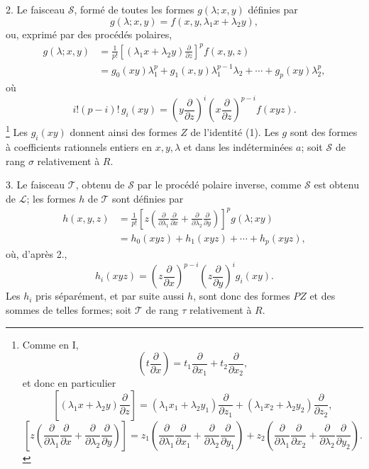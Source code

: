 2. Le faisceau $\mathcal S$, formé de toutes les formes $g(\lambda;x,y)$ définies par
\[
  g(\lambda;x,y)=f(x,y,\lambda_1x+\lambda_2y),
\]
ou, exprimé par des procédés polaires,
\[
\begin{aligned}
  g(\lambda;x,y)
  &=\frac1{p!}\left[(\lambda_1x+\lambda_2y)\frac{\partial}{\partial z}\right]^p f(x,y,z) \\
  &=g_0(xy)\lambda_1^p+g_1(x,y)\lambda_1^{p-1}\lambda_2+\cdots+g_p(xy)\lambda_2^p,
\end{aligned}
\]
où
\[
  i!(p-i)!\,g_i(xy)=
  \left(y\frac{\partial}{\partial z}\right)^i
  \left(x\frac{\partial}{\partial z}\right)^{p-i}f(xyz).
\]
\footnote{Comme en I,
\[
 \left(t\frac{\partial}{\partial x}\right)=t_1\frac{\partial}{\partial x_1}+t_2\frac{\partial}{\partial x_2},
\]
et donc en particulier
\[
 \left[(\lambda_1x+\lambda_2y)\frac{\partial}{\partial z}\right]
 = (\lambda_1x_1+\lambda_2y_1)\frac{\partial}{\partial z_1}
 + (\lambda_1x_2+\lambda_2y_2)\frac{\partial}{\partial z_2},
\]
\[
 \left[z\left(\frac{\partial}{\partial\lambda_1}\frac{\partial}{\partial x}
 +\frac{\partial}{\partial\lambda_2}\frac{\partial}{\partial y}\right)\right]
 =z_1\left(\frac{\partial}{\partial\lambda_1}\frac{\partial}{\partial x_1}
 +\frac{\partial}{\partial\lambda_2}\frac{\partial}{\partial y_1}\right)
 +z_2\left(\frac{\partial}{\partial\lambda_1}\frac{\partial}{\partial x_2}
 +\frac{\partial}{\partial\lambda_2}\frac{\partial}{\partial y_2}\right).
\]}
Les $g_i(xy)$ donnent ainsi des formes $Z$ de l'identité (1). Les $g$ sont des formes à coefficients rationnels entiers en $x,y,\lambda$ et dans les indéterminées $a$; soit $\mathcal S$ de rang $\sigma$ relativement à $R$.

3. Le faisceau $\mathcal T$, obtenu de $\mathcal S$ par le procédé polaire inverse, comme $\mathcal S$ est obtenu de $\mathcal L$; les formes $h$ de $\mathcal T$ sont définies par
\[
\begin{aligned}
 h(x,y,z)
 &=\frac1{p!}\left[z\left(\frac{\partial}{\partial\lambda_1}\frac{\partial}{\partial x}
 +\frac{\partial}{\partial\lambda_2}\frac{\partial}{\partial y}\right)\right]^p g(\lambda;xy)\\
 &=h_0(xyz)+h_1(xyz)+\cdots+h_p(xyz),
\end{aligned}
\]
où, d'après 2.,
\[
  h_i(xyz)=
  \left(z\frac{\partial}{\partial x}\right)^{p-i}
  \left(z\frac{\partial}{\partial y}\right)^i g_i(xy).
\]
Les $h_i$ pris séparément, et par suite aussi $h$, sont donc des formes $PZ$ et des sommes de telles formes; soit $\mathcal T$ de rang $\tau$ relativement à $R$.


